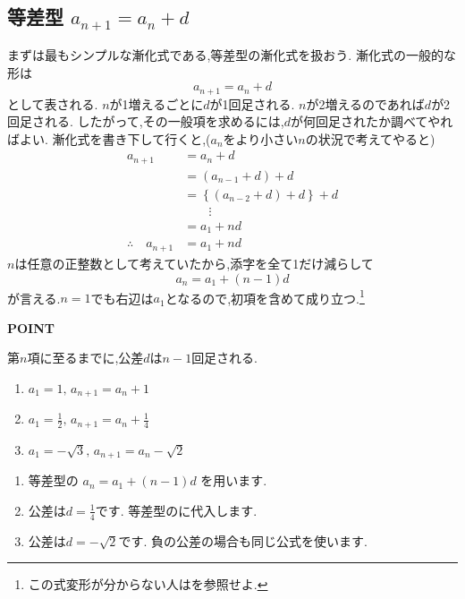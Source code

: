 
\subsection{\texorpdfstring{等差型  $a_{n+1}=a_n+d$}{等差型}}\label{節：等差型}
まずは最もシンプルな漸化式である,等差型の漸化式を扱おう.
漸化式の一般的な形は
\[
  a_{n+1}=a_n+d
\]
として表される.
$n$が1増えるごとに$d$が1回足される.
$n$が2増えるのであれば$d$が2回足される.
したがって,その一般項を求めるには,$d$が何回足されたか調べてやればよい.
漸化式を書き下して行くと,($a_n$をより小さい$n$の状況で考えてやると)
\begin{align*}
  a_{n+1}&=a_{n}+d\\
  &=(a_{n-1}+d)+d\\
  &=\left\{(a_{n-2}+d)+d\right\}+d\\
  &\qquad \vdots\\
  &=a_1+nd\\
  \therefore \quad a_{n+1}&=a_1+nd
\end{align*}
$n$は任意の正整数として考えていたから,添字を全て1だけ減らして
\[
  a_n=a_1+(n-1)d
\]
が言える.$n=1$でも右辺は$a_1$となるので,初項を含めて成り立つ.\footnote{この式変形が分からない人はを参照せよ.}
\begin{bookpoint}
  \textbf{POINT}\par
  第$n$項に至るまでに,公差$d$は$n-1$回足される.
\end{bookpoint}


\noindent {}\par\nobreak
\begin{enumerate}[label=(\arabic*),parsep=3pt,format=\bookitemlink{example-arithmetic-1}{problem}{hint}]
  \item $a_1=1,\, a_{n+1}=a_n+1$
  \item $a_1=\frac{1}{2},\, a_{n+1}=a_n+\frac{1}{4}$
  \item $a_1=-\sqrt{3},\, a_{n+1}=a_n-\sqrt{2}$
\end{enumerate}

\noindent{}\par\nobreak
\begin{enumerate}[label=(\arabic*),parsep=3pt,format=\bookitemlink{example-arithmetic-1}{hint}{answer}]
  \item 等差型の
    $a_n=a_1+(n-1)d$
    を用います.
  \item 公差は$d=\frac14$です.
    等差型のに代入します.
  \item 公差は$d=-\sqrt2$です.
    負の公差の場合も同じ公式を使います.
\end{enumerate}

